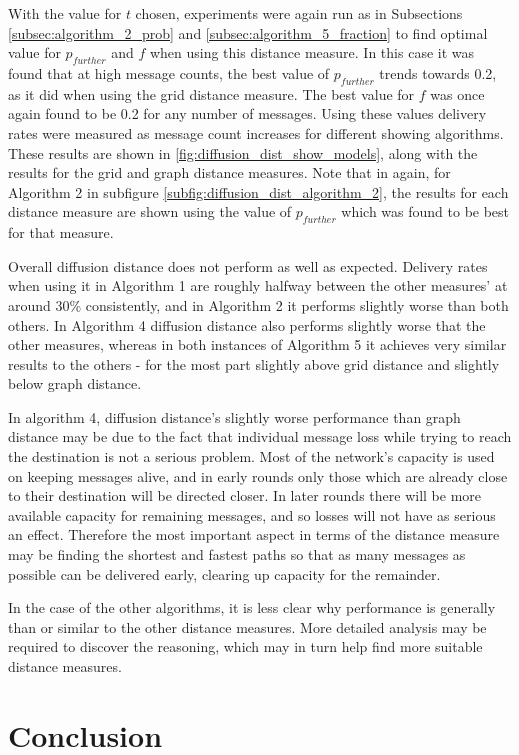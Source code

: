 \documentclass[bsc,frontabs,twoside,singlespacing,parskip,deptreport]{infthesis}     %
\begin{document}
With the value for $t$ chosen, experiments were again run as in Subsections \ref{subsec:algorithm_2_prob} and \ref{subsec:algorithm_5_fraction} to find optimal value for $p_{further}$ and $f$ when using this distance measure. In this case it was found that at high message counts, the best value of $p_{further}$ trends towards 0.2, as it did when using the grid distance measure. The best value for $f$ was once again found to be 0.2 for any number of messages. Using these values delivery rates were measured as message count increases for different showing algorithms. These results are shown in \ref{fig:diffusion_dist_show_models}, along with the results for the grid and graph distance measures. Note that in again, for Algorithm 2 in subfigure \ref{subfig:diffusion_dist_algorithm_2}, the results for each distance measure are shown using the value of $p_{further}$ which was found to be best for that measure.

Overall diffusion distance does not perform as well as expected. Delivery rates when using it in Algorithm 1 are roughly halfway between the other measures' at around 30\% consistently, and in Algorithm 2 it performs slightly worse than both others. In Algorithm 4 diffusion distance also performs slightly worse that the other measures, whereas in both instances of Algorithm 5 it achieves very similar results to the others - for the most part slightly above grid distance and slightly below graph distance.

In algorithm 4, diffusion distance's slightly worse performance than graph distance may be due to the fact that individual message loss while trying to reach the destination is not a serious problem. Most of the network's capacity is used on keeping messages alive, and in early rounds only those which are already close to their destination will be directed closer. In later rounds there will be more available capacity for remaining messages, and so losses will not have as serious an effect. Therefore the most important aspect in terms of the distance measure may be finding the shortest and fastest paths so that as many messages as possible can be delivered early, clearing up capacity for the remainder.

In the case of the other algorithms, it is less clear why performance is generally than or similar to the other distance measures. More detailed analysis may be required to discover the reasoning, which may in turn help find more suitable distance measures.


\chapter{Conclusion}



\end{document}
